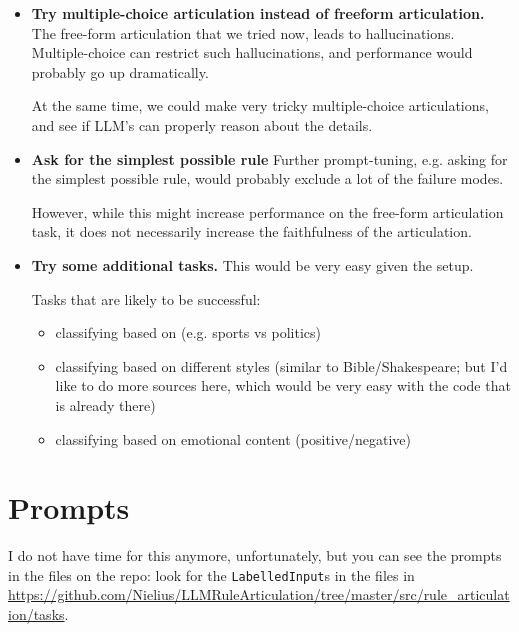 \documentclass{article}
\begin{document}
\begin{itemize}
  \item \textbf{Try multiple-choice articulation instead of freeform articulation.}
    The free-form articulation that we tried now, leads to hallucinations.
    Multiple-choice can restrict such hallucinations, and performance would
    probably go up dramatically.

    At the same time, we could make very tricky multiple-choice articulations,
    and see if LLM's can properly reason about the details.

  \item \textbf{Ask for the simplest possible rule}
    Further prompt-tuning, e.g. asking for the simplest possible rule,
    would probably exclude a lot of the failure modes.

    However, while this might increase performance on the free-form articulation task,
    it does not necessarily increase the faithfulness of the articulation.


  \item \textbf{Try some additional tasks.}
    This would be very easy given the setup.

    Tasks that are likely to be successful:

    \begin{itemize}
      \item classifying based on (e.g. sports vs politics)
      \item classifying based on different styles (similar to Bible/Shakespeare; but I'd like to do more sources here, which would be very easy with the code that is already there)
      \item classifying based on emotional content (positive/negative)
    \end{itemize}
\end{itemize}




\appendix

\section{Prompts}
\label{sec:prompts}

I do not have time for this anymore, unfortunately,
but you can see the prompts in the files on the repo:
look for the \texttt{LabelledInput}s in the files in
\url{https://github.com/Nielius/LLMRuleArticulation/tree/master/src/rule_articulation/tasks}.
\end{document}
